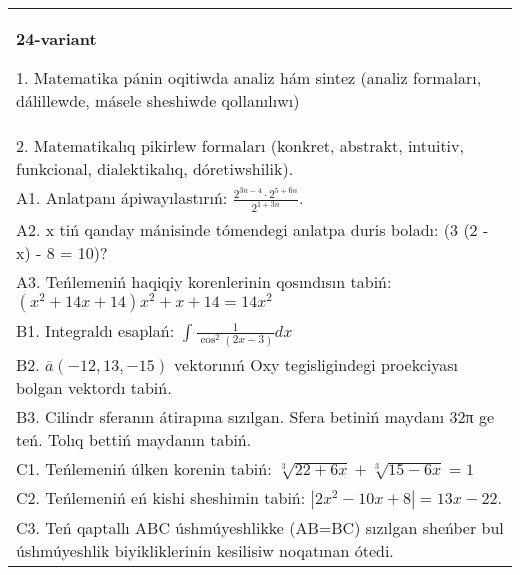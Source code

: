 \documentclass{article}
\begin{document}
\begin{tabular}{m{17cm}}
\textbf{24-variant}

1. Matematika pánin oqitiwda analiz hám sintez (analiz formaları, dálillewde, másele sheshiwde qollanılıwı) \\
2. Matematikalıq pikirlew formaları (konkret, abstrakt, intuitiv, funkcional, dialektikalıq, dóretiwshilik). \\
A1. Anlatpanı ápiwayılastırıń: \(\frac{2^{3n - 4} \cdot 2^{5 + 6n}}{2^{1 + 3n}}\). \\
A2. x tiń qanday mánisinde tómendegi anlatpa duris boladı: (3 (2 - x) - 8 = 10)? \\
A3. Teńlemeniń haqiqiy korenlerinin qosındısın tabiń: \((x^2 + 14x + 14) x^2 + x + 14 = 14x^2\) \\
B1. Integraldı esaplań: \(\int_{}^{}{\frac{1}{\cos^{2} (2x - 3) }dx}\) \\
B2. \(\overline{a} (- 12,13, - 15) \) vektorınıń Oxy tegisligindegi proekciyası bolgan vektordı tabiń. \\
B3. Cilindr sferanın átirapına sızılgan. Sfera betiniń maydanı 32π ge teń. Tolıq bettiń maydanın tabiń. \\
C1. Teńlemeniń úlken korenin tabiń: \(\sqrt[3]{22 + 6x} + \sqrt[3]{15 - 6x} = 1\) \\
C2. Teńlemeniń eń kishi sheshimin tabiń: \(\left| 2x^2 - 10x + 8 \right| = 13x - 22\). \\
C3. Teń qaptallı ABC úshmúyeshlikke (AB=BC) sızılgan sheńber bul úshmúyeshlik biyikliklerinin kesilisiw noqatınan ótedi. \\

\end{tabular}
\vspace{1cm}
\end{document}
